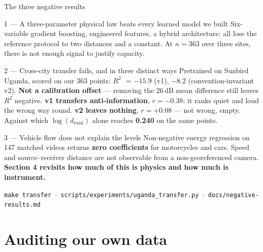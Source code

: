 \documentclass[aspectratio=169,10pt]{beamer}
\newcommand{\src}[1]{{\scriptsize\color{muted}\texttt{#1}}}
\newcommand{\up}[1]{\textcolor{good}{\textbf{#1}}}
\newcommand{\down}[1]{\textcolor{bad}{\textbf{#1}}}
\newcommand{\wn}[1]{\textcolor{warn}{\textbf{#1}}}
\newcommand{\dB}{\,\mathrm{dB}}
\newcommand{\rr}{$R^2$}
\begin{document}
\begin{frame}{The three negative results}
  \begin{block}{1 --- A three-parameter physical law beats every learned model we built}
    Six-variable gradient boosting, engineered features, a hybrid
    architecture: all lose the reference protocol to two distances and a constant.
    At $n = 363$ over three sites, there is not enough signal to justify capacity.
  \end{block}
  \begin{block}{2 --- Cross-city transfer fails, and in three distinct ways}
    Pretrained on Sunbird Uganda, scored on our 363 points: \down{\rr{} $=-15.9$}
    (v1), \down{$-8.2$} (convention-invariant v2). \textbf{Not a calibration
    offset} --- removing the $26\dB$ mean difference still leaves \rr{} negative.
    \textbf{v1 transfers anti-information}, $r = -0.38$: it ranks quiet and loud
    the wrong way round. \textbf{v2 leaves nothing}, $r = +0.08$ --- not wrong,
    empty. Against which $\log(d_\mathrm{road})$ alone reaches \up{0.240} on the
    same points.
  \end{block}
  \begin{block}{3 --- Vehicle flow does not explain the levels}
    Non-negative energy regression on 147 matched videos returns
    \textbf{zero coefficients} for motorcycles and cars. Speed and
    source--receiver distance are not observable from a non-georeferenced camera.
    \wn{Section 4 revisits how much of this is physics and how much is instrument.}
  \end{block}
  \vfill
  \src{make transfer \; $\cdot$ \; scripts/experiments/uganda\_transfer.py \; $\cdot$ \; docs/negative-results.md}
\end{frame}

\section{Auditing our own data}
\end{document}
